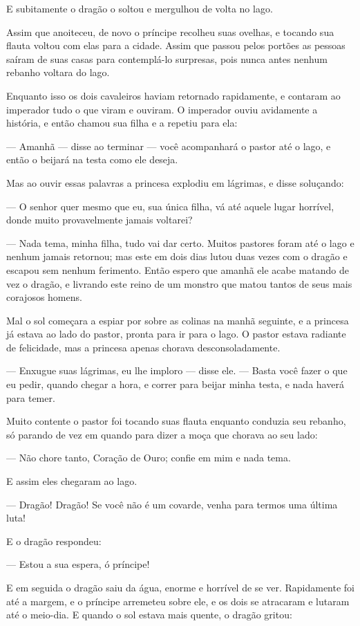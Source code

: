 E subitamente o dragão o soltou e mergulhou de volta no lago.

Assim que anoiteceu, de novo o príncipe recolheu suas ovelhas, e
tocando sua flauta voltou com elas para a cidade. Assim que passou
pelos portões as pessoas saíram de suas casas para contemplá-lo
surpresas, pois nunca antes nenhum rebanho voltara do lago.

Enquanto isso os dois cavaleiros haviam retornado rapidamente, e
contaram ao imperador tudo o que viram e ouviram. O imperador ouviu
avidamente a história, e então chamou sua filha e a repetiu para ela:

— Amanhã — disse ao terminar — você acompanhará o pastor até o lago, e
então o beijará na testa como ele deseja.

Mas ao ouvir essas palavras a princesa explodiu em lágrimas, e disse
soluçando:

— O senhor quer mesmo que eu, sua única filha, vá até aquele lugar
horrível, donde muito provavelmente jamais voltarei?

— Nada tema, minha filha, tudo vai dar certo. Muitos pastores foram
até o lago e nenhum jamais retornou; mas este em dois dias lutou duas
vezes com o dragão e escapou sem nenhum ferimento. Então espero que
amanhã ele acabe matando de vez o dragão, e livrando este reino de um
monstro que matou tantos de seus mais corajosos homens.

Mal o sol começara a espiar por sobre as colinas na manhã seguinte, e
a princesa já estava ao lado do pastor, pronta para ir para o lago. O
pastor estava radiante de felicidade, mas a princesa apenas chorava
desconsoladamente.

— Enxugue suas lágrimas, eu lhe imploro — disse ele. — Basta você
fazer o que eu pedir, quando chegar a hora, e correr para beijar
minha testa, e nada haverá para temer. 

Muito contente o pastor foi tocando suas flauta enquanto conduzia seu
rebanho, só parando de vez em quando para dizer a moça que chorava ao
seu lado:

— Não chore tanto, Coração de Ouro; confie em mim e nada tema. 

E assim eles chegaram ao lago. 

— Dragão! Dragão! Se você não é um covarde, venha para termos uma
última luta!

E o dragão respondeu: 

— Estou a sua espera, ó príncipe! 

E em seguida o dragão saiu da água, enorme e horrível de se ver.
Rapidamente foi até a margem, e o príncipe arremeteu sobre ele, e os
dois se atracaram e lutaram até o meio-dia. E quando o sol estava
mais quente, o dragão gritou:

